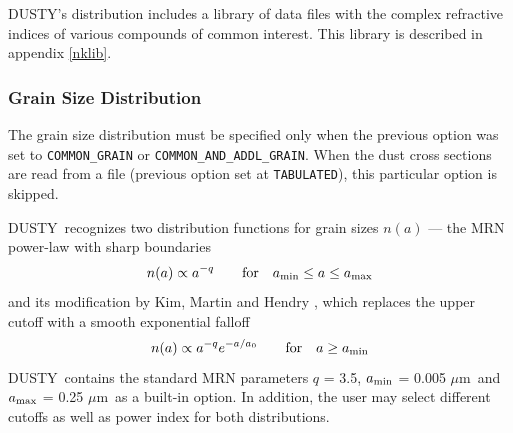 \documentclass[11pt]{article}
\def\D  {{\sf DUSTY}}
\def\eq#1{\begin{equation} #1 \end{equation}}
\def\mic    {\hbox{$\mu$m}}
\begin{document}
\D's distribution includes a library of data files with the complex refractive
indices of various compounds of common interest. This library is described in
appendix \ref{nklib}.


\subsubsection{Grain Size Distribution}

The grain size distribution must be specified only when the previous option was
set to {\tt COMMON\_GRAIN} or {\tt COMMON\_AND\_ADDL\_GRAIN}.  When the dust cross
sections are read from a file (previous option set at {\tt TABULATED}), this particular
option is skipped.

\D\ recognizes two distribution functions for grain sizes $n(a)$ --- the MRN
\cite{MRN77} power-law with sharp boundaries
\eq{
         n(a) \propto a^{-q} \qquad \hbox{for} \quad
                a_{\rm min} \le a \le a_{\rm max}
}
and its modification by Kim, Martin and Hendry \cite{KMH94}, which replaces the
upper cutoff with a smooth exponential falloff
\eq{
  n(a) \propto a^{-q} e^{-a/a_0} \qquad \hbox{for} \quad a \ge a_{\rm min}
}
\D\ contains the standard MRN parameters $q$ = 3.5, $a_{\rm min}$ = 0.005 \mic\
and $a_{\rm max}$ = 0.25 \mic\ as a built-in option.  In addition, the user may
select different cutoffs as well as power index for both distributions.
\end{document}
